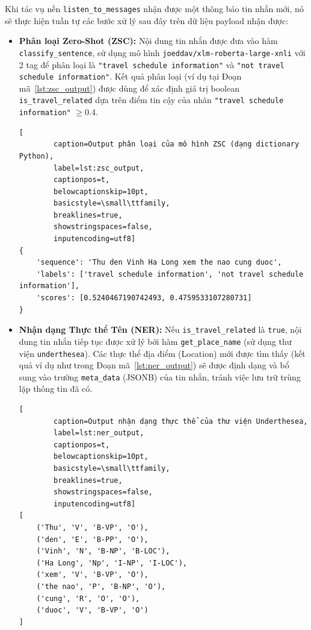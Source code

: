 \begin{enumerate}
\noindent Khi tác vụ nền \texttt{listen\_to\_messages} nhận được một thông báo tin nhắn mới, nó sẽ thực hiện tuần tự các bước xử lý sau đây trên dữ liệu payload nhận được:
\begin{itemize}
    \item \textbf{Phân loại Zero-Shot (ZSC):} Nội dung tin nhắn được đưa vào hàm \texttt{classify\_sentence}, sử dụng mô hình \texttt{joeddav/xlm-roberta-large-xnli} với 2 tag để phân loại là \texttt{"travel schedule information"} và \texttt{"not travel schedule information"}. Kết quả phân loại (ví dụ tại Đoạn mã~\ref{lst:zsc_output}) được dùng để xác định giá trị boolean \texttt{is\_travel\_related} dựa trên điểm tin cậy của nhãn \texttt{"travel schedule information"} $\geq 0.4$.
    \newpage 
    \lstset{language=json}
    \begin{lstlisting}[
        caption=Output phân loại của mô hình ZSC (dạng dictionary Python),
        label=lst:zsc_output,
        captionpos=t,
        belowcaptionskip=10pt,
        basicstyle=\small\ttfamily,
        breaklines=true,
        showstringspaces=false,
        inputencoding=utf8] 
{
    'sequence': 'Thu den Vinh Ha Long xem the nao cung duoc',
    'labels': ['travel schedule information', 'not travel schedule information'],
    'scores': [0.5240467190742493, 0.4759533107280731]
}
    \end{lstlisting}
    \item \textbf{Nhận dạng Thực thể Tên (NER):} Nếu \texttt{is\_travel\_related} là \texttt{true}, nội dung tin nhắn tiếp tục được xử lý bởi hàm \texttt{get\_place\_name} (sử dụng thư viện \texttt{underthesea}). Các thực thể địa điểm (Location) mới được tìm thấy (kết quả ví dụ như trong Đoạn mã~\ref{lst:ner_output}) sẽ được định dạng và bổ sung vào trường \texttt{meta\_data} (JSONB) của tin nhắn, tránh việc lưu trữ trùng lặp thông tin đã có.
    \lstset{language=Python}
    \begin{lstlisting}[
        caption=Output nhận dạng thực thể của thư viện Underthesea,
        label=lst:ner_output, 
        captionpos=t,
        belowcaptionskip=10pt,
        basicstyle=\small\ttfamily,
        breaklines=true,
        showstringspaces=false,
        inputencoding=utf8] 
[
    ('Thu', 'V', 'B-VP', 'O'), 
    ('den', 'E', 'B-PP', 'O'),
    ('Vinh', 'N', 'B-NP', 'B-LOC'),
    ('Ha Long', 'Np', 'I-NP', 'I-LOC'), 
    ('xem', 'V', 'B-VP', 'O'),
    ('the nao', 'P', 'B-NP', 'O'),
    ('cung', 'R', 'O', 'O'),
    ('duoc', 'V', 'B-VP', 'O')
]
    \end{lstlisting}


\end{itemize}
\end{enumerate}
